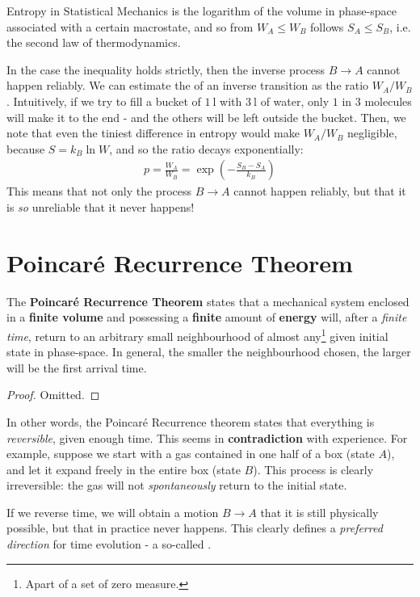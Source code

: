 \documentclass[../template.tex]{subfiles}
\begin{document}
\medskip

Entropy in Statistical Mechanics is the logarithm of the volume in phase-space associated with a certain macrostate, and so from $W_A \leq W_B$ follows $S_A \leq S_B$, i.e. the second law of thermodynamics.

\medskip

In the case the inequality holds strictly, then the inverse process $B \to A$ cannot happen reliably. We can estimate the  of an inverse transition as the ratio $W_A/W_B$. Intuitively, if we try to fill a bucket of $\SI{1}{\l}$ with $\SI{3}{\l}$ of water, only $1$ in $3$ molecules will make it to the end - and the others will be left outside the bucket. Then, we note that even the tiniest difference in entropy would make $W_A/W_B$ negligible, because $S = k_B \ln W$, and so the ratio decays exponentially:
\begin{align*}
    p = \frac{W_A}{W_B} = \exp\left(-\frac{S_B - S_A}{k_B} \right) 
\end{align*}
This means that not only the process $B \to A$ cannot happen reliably, but that it is \textit{so} unreliable that it never happens! 

\section{Poincaré Recurrence Theorem}
The \textbf{Poincaré Recurrence Theorem} states that a mechanical system enclosed in a \textbf{finite volume} and possessing a \textbf{finite} amount of \textbf{energy} will, after a \textit{finite time}, return to an arbitrary small neighbourhood of almost any\footnote{Apart of a set of zero measure.} given initial state in phase-space. In general, the smaller the neighbourhood chosen, the larger will be the first arrival time.

\begin{proof}
    Omitted.
\end{proof}

In other words, the Poincaré Recurrence theorem states that everything is \textit{reversible}, given enough time.  
This seems in \textbf{contradiction}  with experience. For example, suppose we start with a gas contained in one half of a box (state $A$), and let it expand freely in the entire box (state $B$). This process is clearly irreversible: the gas will not \textit{spontaneously} return to the initial state. 

If we reverse time, we will obtain a motion $B \to A$ that it is still physically possible, but that in practice never happens. This clearly defines a \textit{preferred direction} for time evolution - a so-called . 
\end{document}
